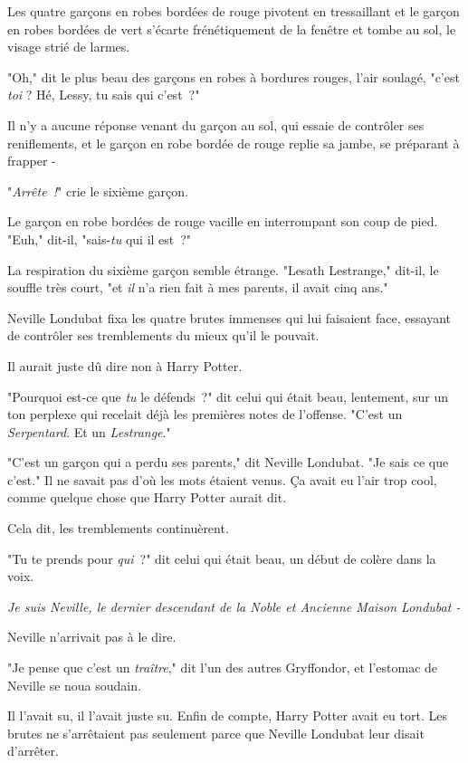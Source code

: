 Les quatre garçons en robes bordées de rouge pivotent en tressaillant et le garçon en robes bordées de vert s'écarte frénétiquement de la fenêtre et tombe au sol, le visage strié de larmes.

"Oh," dit le plus beau des garçons en robes à bordures rouges, l'air soulagé, "c'est \emph{toi} ? Hé, Lessy, tu sais qui c'est~?"

Il n'y a aucune réponse venant du garçon au sol, qui essaie de contrôler ses reniflements, et le garçon en robe bordée de rouge replie sa jambe, se préparant à frapper -

"\emph{Arrête~!}" crie le sixième garçon.

Le garçon en robe bordées de rouge vacille en interrompant son coup de pied. "Euh," dit-il, "sais-\emph{tu} qui il est~?"

La respiration du sixième garçon semble étrange. "Lesath Lestrange," dit-il, le souffle très court, "et \emph{il} n'a rien fait à mes parents, il avait cinq ans."

\later

Neville Londubat fixa les quatre brutes immenses qui lui faisaient face, essayant de contrôler ses tremblements du mieux qu'il le pouvait.

Il aurait juste dû dire non à Harry Potter.

"Pourquoi est-ce que \emph{tu} le défends~?" dit celui qui était beau, lentement, sur un ton perplexe qui recelait déjà les premières notes de l'offense. "C'est un \emph{Serpentard}. Et un \emph{Lestrange}."

"C'est un garçon qui a perdu ses parents," dit Neville Londubat. "Je sais ce que c'est." Il ne savait pas d'où les mots étaient venus. Ça avait eu l'air trop cool, comme quelque chose que Harry Potter aurait dit.

Cela dit, les tremblements continuèrent.

"Tu te prends pour \emph{qui}~?" dit celui qui était beau, un début de colère dans la voix.

\emph{Je suis Neville, le dernier descendant de la Noble et Ancienne Maison Londubat -}

Neville n'arrivait pas à le dire.

"Je pense que c'est un \emph{traître}," dit l'un des autres Gryffondor, et l'estomac de Neville se noua soudain.

Il l'avait su, il l'avait juste su. Enfin de compte, Harry Potter avait eu tort. Les brutes ne s'arrêtaient pas seulement parce que Neville Londubat leur disait d'arrêter.


